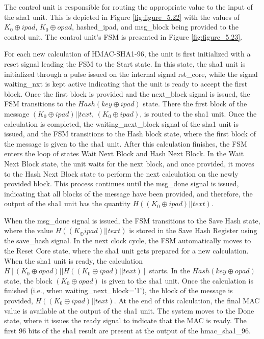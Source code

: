The control unit is responsible for routing the appropriate value to the input of the sha1 unit. This is depicted in Figure \ref{fig:figure_5.22} with the values of $K_0\oplus ipad$, $K_0\oplus opad$, hashed\_ipad, and msg\_block being provided to the control unit. The control unit's FSM is presented in Figure \ref{fig:figure_5.23}.

For each new calculation of HMAC-SHA1-96, the unit is first initialized with a reset signal leading the FSM to the Start state. In this state, the sha1 unit is initialized through a pulse issued on the internal signal rst\_core, while the signal waiting\_nxt is kept active indicating that the unit is ready to accept the first block. Once the first block is provided and the next\_block signal is issued, the FSM transitions to the $Hash(key\oplus ipad)$ state. There the first block of the message $(K_0\oplus ipad) || text$, $(K_0\oplus ipad)$, is routed to the sha1 unit. Once the calculation is completed, the waiting\_next\_block signal of the sha1 unit is issued, and the FSM transitions to the Hash  block state, where the first block of the message is given to the sha1 unit. After this calculation finishes, the FSM enters the loop of states Wait Next Block and Hash Next Block. In the Wait Next Block state, the unit waits for the next block, and once provided, it moves to the Hash Next Block state to perform the next calculation on the newly provided block. This process continues until the msg\_done signal is issued, indicating that all blocks of the message have been provided, and therefore, the output of the sha1 unit has the quantity $H((K_0\oplus ipad) || text)$.

When the msg\_done signal is issued, the FSM transitions to the Save Hash state, where the value $H((K_\oplus ipad) || text)$ is stored in the Save Hash Register using the save\_hash signal. In the next clock cycle, the FSM automatically moves to the Reset Core state, where the sha1 unit gets prepared for a new calculation. When the sha1 unit is ready, the calculation $H[(K_0\oplus opad) || H((K_0\oplus ipad) || text)]$ starts. In the $Hash(key\oplus opad)$ state, the block $(K_0\oplus opad)$ is given to the sha1 unit. Once the calculation is finished (i.e., when waiting\_next\_block='1'), the  block of the message is provided, $H((K_0\oplus ipad) || text)$. At the end of this calculation, the final MAC value is available at the output of the sha1 unit. The system moves to the Done state, where it issues the ready signal to indicate that the MAC is ready. The first 96 bits of the sha1 result are present at the output of the hmac\_sha1\_96.

